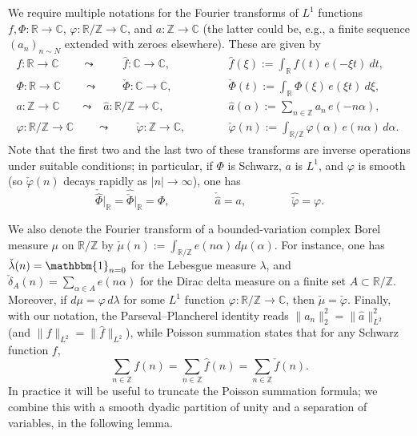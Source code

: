 \documentclass[reqno,11pt]{amsart}
\theoremstyle{remark}
\numberwithin{equation}{section}
\newcommand{\Z}{\mathbb{Z}}
\newcommand{\R}{\mathbb{R}}
\newcommand{\C}{\mathbb{C}}
\newcommand{\one}{\mathbbm{1}}
\renewcommand{\hat}{\widehat}
\begin{document}
We require multiple notations for the Fourier transforms of $L^1$ functions $f, \Phi : \R \to \C$, $\varphi : \R/\Z \to \C$, and $a : \Z \to \C$ (the latter could be, e.g., a finite sequence $(a_n)_{n \sim N}$ extended with zeroes elsewhere). These are given by
\begin{equation} \label{eq:fourier-transforms}
\begin{aligned}
    f : \R \to \C \qquad 
    \leadsto \qquad\,\,
    \hat{f} : \C \to \C, \qquad\quad 
    &\hat{f}(\xi) := \int_\R f(t)\, e(-\xi t)\ dt, 
    \\
    \Phi : \R \to \C \qquad 
    \leadsto \qquad\,
    \check{\Phi} : \C \to \C, \qquad\quad 
    &\check{\Phi}(t) := \int_\R \Phi(\xi)\, e(\xi t)\ d\xi, 
    \\ 
    a : \Z \to \C \quad\ \ \, \,
    \leadsto \ \ \, \,
    \hat{a} : \R/\Z \to \C, \qquad\quad 
    &\hat{a}(\alpha) := \sum_{n \in \Z} a_n\, e(-n\alpha), \qquad 
    \\
    \varphi : \R/\Z \to \C \qquad 
    \leadsto \qquad \
    \check{\varphi} : \Z \to \C, \qquad\quad 
    &\check{\varphi}(n) := \int_{\R/\Z} \varphi(\alpha)\, e(n\alpha)\, d\alpha.
\end{aligned}
\end{equation}
Note that the first two and the last two of these transforms are inverse operations under suitable conditions; in particular, if $\Phi$ is Schwarz, $a$ is $L^1$, and $\varphi$ is smooth (so $\check{\varphi}(n)$ decays rapidly as $|n| \to \infty$), one has
\begin{equation} \label{eq:Fourier-inverses}
    \check{\hat{\Phi}} \Big\vert_\R = \hat{\check{\Phi}} \Big\vert_\R = \Phi, \qquad\qquad
    \check{\hat{a}} = a, \qquad\qquad
    \hat{\check{\varphi}} = \varphi.
\end{equation}

We also denote the Fourier transform of a bounded-variation complex Borel measure $\mu$ on $\R/\Z$ by $\check{\mu}(n) := \int_{\R/\Z} e(n\alpha)\, d\mu(\alpha)$. For instance, one has $\check{\lambda}(n) = \one_{n = 0}$ for the Lebesgue measure $\lambda$, and $\check{\delta}_{A}(n) = \sum_{\alpha \in A} e(n\alpha)$ for the Dirac delta measure on a finite set $A \subset \R/\Z$. Moreover, if $d\mu = \varphi\, d\lambda$ for some $L^1$ function $\varphi : \R/\Z \to \C$, then $\check{\mu} = \check{\varphi}$. Finally, with our notation, the Parseval--Plancherel identity reads $\|a_n\|_2^2 = \|\hat{a}\|_{L^2}^2$ (and $\|f\|_{L^2} = \|\hat{f}\|_{L^2}$), while Poisson summation states that for any Schwarz function $f$,
\begin{equation} \label{eq:Poisson}
    \sum_{n \in \Z} f(n) = \sum_{n \in \Z} \hat{f}(n) = \sum_{n \in \Z} \check{f}(n).
\end{equation}
In practice it will be useful to truncate the Poisson summation formula; we combine this with a smooth dyadic partition of unity and a separation of variables, in the following lemma.
\end{document}
